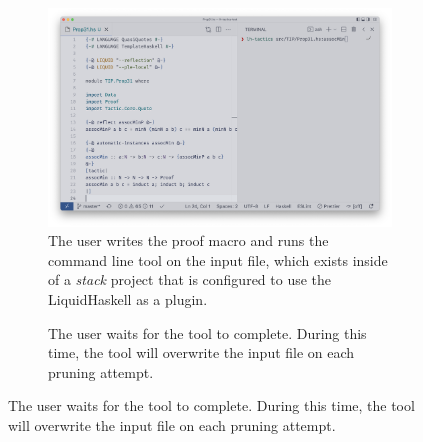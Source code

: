 
\begin{figure}
  \centering

  \begin{subfigure}[t][][t]{1\textwidth}
    \begin{minipage}[c]{0.63\textwidth}
      \includegraphics[width=\textwidth]{example-screenshots/run.png}
    \end{minipage} 
    \hfill
    \begin{minipage}[c]{0.3\textwidth}
      \caption{The user writes the proof macro and runs the
         command line tool on the input file, which
        exists inside of a \textit{stack} project that is configured
        to use the LiquidHaskell as a plugin.}
    \end{minipage}
  \end{subfigure}
  \begin{subfigure}[t][][t]{1\textwidth}
    \begin{minipage}[c]{0.3\textwidth}
      \caption{The user waits for the  tool to complete. During
      this time, the tool will overwrite the input file on each pruning attempt.}

\end{minipage}
\end{subfigure}
\end{figure}
